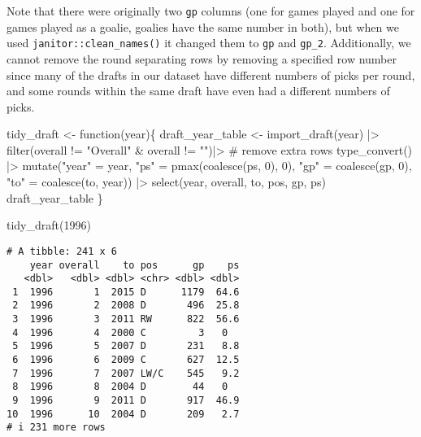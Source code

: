 \documentclass[
  letterpaper,
  DIV=11,
  numbers=noendperiod]{scrreprt}
\newenvironment{Shaded}{\begin{snugshade}}{\end{snugshade}}
\newcommand{\CommentTok}[1]{\textcolor[rgb]{0.37,0.37,0.37}{#1}}
\newcommand{\ControlFlowTok}[1]{\textcolor[rgb]{0.00,0.23,0.31}{#1}}
\newcommand{\DecValTok}[1]{\textcolor[rgb]{0.68,0.00,0.00}{#1}}
\newcommand{\FunctionTok}[1]{\textcolor[rgb]{0.28,0.35,0.67}{#1}}
\newcommand{\NormalTok}[1]{\textcolor[rgb]{0.00,0.23,0.31}{#1}}
\newcommand{\OtherTok}[1]{\textcolor[rgb]{0.00,0.23,0.31}{#1}}
\newcommand{\SpecialCharTok}[1]{\textcolor[rgb]{0.37,0.37,0.37}{#1}}
\newcommand{\StringTok}[1]{\textcolor[rgb]{0.13,0.47,0.30}{#1}}
\begin{document}
Note that there were originally two \texttt{gp} columns (one for games
played and one for games played as a goalie, goalies have the same
number in both), but when we used \texttt{janitor::clean\_names()} it
changed them to \texttt{gp} and \texttt{gp\_2}. Additionally, we cannot
remove the round separating rows by removing a specified row number
since many of the drafts in our dataset have different numbers of picks
per round, and some rounds within the same draft have even had a
different numbers of picks.

\begin{Shaded}
\begin{Highlighting}[]
\NormalTok{tidy\_draft }\OtherTok{\textless{}{-}} \ControlFlowTok{function}\NormalTok{(year)\{}
\NormalTok{  draft\_year\_table }\OtherTok{\textless{}{-}} \FunctionTok{import\_draft}\NormalTok{(year) }\SpecialCharTok{|\textgreater{}} 
    \FunctionTok{filter}\NormalTok{(overall }\SpecialCharTok{!=} \StringTok{"Overall"} \SpecialCharTok{\&}\NormalTok{ overall }\SpecialCharTok{!=} \StringTok{""}\NormalTok{)}\SpecialCharTok{|\textgreater{}} \CommentTok{\# remove extra rows}
    \FunctionTok{type\_convert}\NormalTok{() }\SpecialCharTok{|\textgreater{}} 
    \FunctionTok{mutate}\NormalTok{(}\StringTok{"year"} \OtherTok{=}\NormalTok{ year, }\StringTok{"ps"} \OtherTok{=} \FunctionTok{pmax}\NormalTok{(}\FunctionTok{coalesce}\NormalTok{(ps, }\DecValTok{0}\NormalTok{), }\DecValTok{0}\NormalTok{), }
           \StringTok{"gp"} \OtherTok{=} \FunctionTok{coalesce}\NormalTok{(gp, }\DecValTok{0}\NormalTok{), }\StringTok{"to"} \OtherTok{=} \FunctionTok{coalesce}\NormalTok{(to, year)) }\SpecialCharTok{|\textgreater{}} 
    \FunctionTok{select}\NormalTok{(year, overall, to, pos, gp, ps)}
\NormalTok{  draft\_year\_table}
\NormalTok{\}}

\FunctionTok{tidy\_draft}\NormalTok{(}\DecValTok{1996}\NormalTok{)}
\end{Highlighting}
\end{Shaded}

\begin{verbatim}
# A tibble: 241 x 6
    year overall    to pos      gp    ps
   <dbl>   <dbl> <dbl> <chr> <dbl> <dbl>
 1  1996       1  2015 D      1179  64.6
 2  1996       2  2008 D       496  25.8
 3  1996       3  2011 RW      822  56.6
 4  1996       4  2000 C         3   0  
 5  1996       5  2007 D       231   8.8
 6  1996       6  2009 C       627  12.5
 7  1996       7  2007 LW/C    545   9.2
 8  1996       8  2004 D        44   0  
 9  1996       9  2011 D       917  46.9
10  1996      10  2004 D       209   2.7
# i 231 more rows
\end{verbatim}
\end{document}
